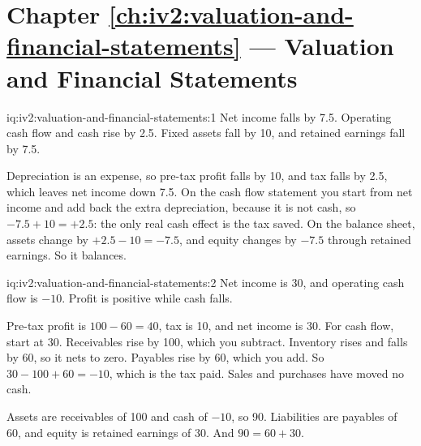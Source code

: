 \section*{Chapter \ref{ch:iv2:valuation-and-financial-statements} --- Valuation and Financial Statements}

\begin{solution}{iq:iv2:valuation-and-financial-statements:1}
Net income falls by 7.5. Operating cash flow and cash rise by 2.5. Fixed assets fall by 10, and retained earnings fall by 7.5.

Depreciation is an expense, so pre-tax profit falls by 10, and tax falls by 2.5, which leaves net income down 7.5. On the cash flow statement you start from net income and add back the extra depreciation, because it is not cash, so $-7.5 + 10 = +2.5$: the only real cash effect is the tax saved. On the balance sheet, assets change by $+2.5 - 10 = -7.5$, and equity changes by $-7.5$ through retained earnings. So it balances.

\end{solution}

\begin{solution}{iq:iv2:valuation-and-financial-statements:2}
Net income is 30, and operating cash flow is $-10$. Profit is positive while cash falls.

Pre-tax profit is $100 - 60 = 40$, tax is 10, and net income is 30. For cash flow, start at 30. Receivables rise by 100, which you subtract. Inventory rises and falls by 60, so it nets to zero. Payables rise by 60, which you add. So $30 - 100 + 60 = -10$, which is the tax paid. Sales and purchases have moved no cash.

Assets are receivables of 100 and cash of $-10$, so 90. Liabilities are payables of 60, and equity is retained earnings of 30. And $90 = 60 + 30$.

\end{solution}

